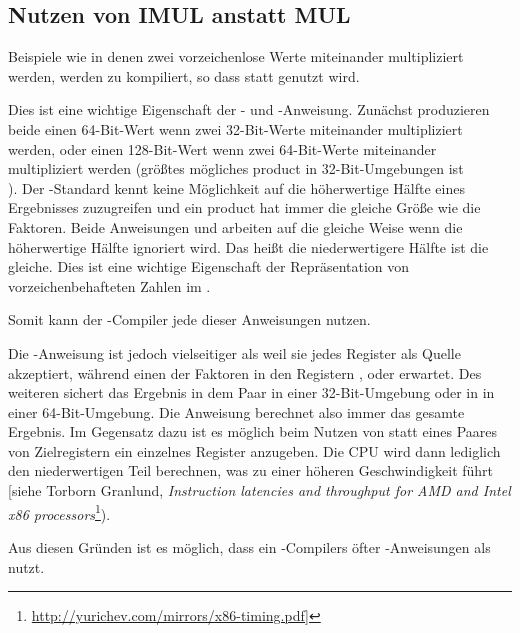 \subsection{Nutzen von IMUL anstatt MUL}
\label{IMUL_over_MUL}

Beispiele wie  in denen zwei vorzeichenlose Werte miteinander multipliziert
werden, werden zu  kompiliert, so dass \IMUL statt \MUL genutzt wird.

Dies ist eine wichtige Eigenschaft der \MUL- und \IMUL-Anweisung.
Zunächst produzieren beide einen 64-Bit-Wert wenn zwei 32-Bit-Werte miteinander multipliziert werden,
oder einen 128-Bit-Wert wenn zwei 64-Bit-Werte miteinander multipliziert werden (größtes mögliches \gls{product}
in 32-Bit-Umgebungen ist \\
).
Der \CCpp-Standard kennt keine Möglichkeit auf die höherwertige Hälfte eines Ergebnisses zuzugreifen
und ein \gls{product} hat immer die gleiche Größe wie die Faktoren. %
Beide Anweisungen \MUL und \IMUL arbeiten auf die gleiche Weise wenn die höherwertige Hälfte ignoriert wird.
Das heißt die niederwertigere Hälfte ist die gleiche.
Dies ist eine wichtige Eigenschaft der Repräsentation von vorzeichenbehafteten Zahlen im .

Somit kann der \CCpp-Compiler jede dieser Anweisungen nutzen.

Die \IMUL-Anweisung ist jedoch vielseitiger als \MUL weil sie jedes Register als Quelle akzeptiert,
während \MUL einen der Faktoren in den Registern \AX, \EAX oder \RAX erwartet.
Des weiteren sichert \MUL das Ergebnis in dem  Paar in einer 32-Bit-Umgebung oder
in  in einer 64-Bit-Umgebung. Die Anweisung berechnet also immer das gesamte Ergebnis.
Im Gegensatz dazu ist es möglich beim Nutzen von \IMUL statt eines Paares von Zielregistern ein
einzelnes Register anzugeben. Die \ac{CPU} wird dann lediglich den niederwertigen Teil berechnen,
was zu einer höheren Geschwindigkeit führt [siehe Torborn Granlund, \emph{Instruction latencies and throughput for AMD and Intel x86 processors}\footnote{\url{http://yurichev.com/mirrors/x86-timing.pdf}]}).

Aus diesen Gründen ist es möglich, dass ein \CCpp-Compilers öfter \IMUL-Anweisungen als \MUL nutzt.

